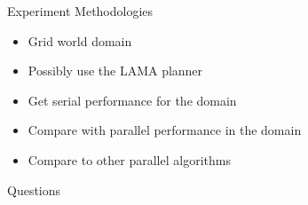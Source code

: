 \documentclass[style=simple]{powerdot}
\begin{document}
\begin{slide}{Experiment Methodologies}
  \begin{itemize}
  \item Grid world domain
  \item Possibly use the LAMA planner
  \item Get serial performance for the domain
  \item Compare with parallel performance in the domain
  \item Compare to other parallel algorithms
  \end{itemize}
\end{slide}

\begin{slide}{Questions}
\end{slide}
\end{document}
